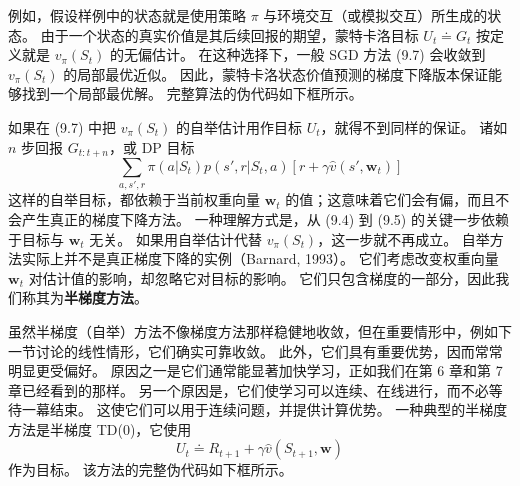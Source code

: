 \documentclass[UTF8, 12pt, fontset=fandol, oneside]{ctexart}
\begin{document}
例如，假设样例中的状态就是使用策略 $\pi$ 与环境交互（或模拟交互）所生成的状态。
由于一个状态的真实价值是其后续回报的期望，蒙特卡洛目标 $U_t\doteq G_t$ 按定义就是 $v_\pi(S_t)$ 的无偏估计。
在这种选择下，一般 SGD 方法 (9.7) 会收敛到 $v_\pi(S_t)$ 的局部最优近似。
因此，蒙特卡洛状态价值预测的梯度下降版本保证能够找到一个局部最优解。
完整算法的伪代码如下框所示。

\begin{center}
\end{center}

如果在 (9.7) 中把 $v_\pi(S_t)$ 的自举估计用作目标 $U_t$，就得不到同样的保证。
诸如 $n$ 步回报 $G_{t:t+n}$，或 DP 目标
\[
\sum_{a,s',r}\pi(a|S_t)p(s',r|S_t,a)\left[r+\gamma\hat{v}(s',\mathbf{w}_t)\right]
\]
这样的自举目标，都依赖于当前权重向量 $\mathbf{w}_t$ 的值；这意味着它们会有偏，而且不会产生真正的梯度下降方法。
一种理解方式是，从 (9.4) 到 (9.5) 的关键一步依赖于目标与 $\mathbf{w}_t$ 无关。
如果用自举估计代替 $v_\pi(S_t)$，这一步就不再成立。
自举方法实际上并不是真正梯度下降的实例（Barnard, 1993）。
它们考虑改变权重向量 $\mathbf{w}_t$ 对估计值的影响，却忽略它对目标的影响。
它们只包含梯度的一部分，因此我们称其为\textbf{半梯度方法}。

虽然半梯度（自举）方法不像梯度方法那样稳健地收敛，但在重要情形中，例如下一节讨论的线性情形，它们确实可靠收敛。
此外，它们具有重要优势，因而常常明显更受偏好。
原因之一是它们通常能显著加快学习，正如我们在第 6 章和第 7 章已经看到的那样。
另一个原因是，它们使学习可以连续、在线进行，而不必等待一幕结束。
这使它们可以用于连续问题，并提供计算优势。
一种典型的半梯度方法是半梯度 TD(0)，它使用
\[
U_t\doteq R_{t+1}+\gamma\hat{v}(S_{t+1},\mathbf{w})
\]
作为目标。
该方法的完整伪代码如下框所示。
\end{document}
